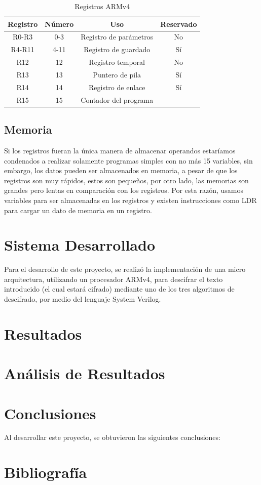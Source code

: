 \documentclass[journal,trans]{IEEEtran}
\begin{document}
	\begin{table}[htbp]
		\centering
		\begin{tabular}{|c|c|c|c|}
			\hline
			Registro & Número & Uso                    & Reservado \\
			\hline
			\hline
			R0-R3    & 0-3    & Registro de parámetros & No        \\
			\hline
			R4-R11   & 4-11   & Registro de guardado   & Sí        \\
			\hline
			R12      & 12     & Registro temporal      & No        \\
			\hline
			R13      & 13     & Puntero de pila        & Sí        \\
			\hline
			R14      & 14     & Registro de enlace     & Sí        \\
			\hline
			R15      & 15     & Contador del programa  &           \\
			\hline
		\end{tabular}
		\caption{Registros ARMv4}
		\label{tab:Registros}
	\end{table}
	
	\subsection{Memoria}
	Si los registros fueran la única manera de almacenar operandos estaríamos condenados a realizar solamente programas simples con no más 15 variables, sin embargo, los datos pueden ser almacenados en memoria, a pesar de que los registros son muy rápidos, estos son pequeños, por otro lado, las memorias son grandes pero lentas en comparación con los registros. Por esta razón, usamos variables para ser almacenadas en los registros y existen instrucciones como LDR para cargar un dato de memoria en un registro.
	
	\section{Sistema Desarrollado}
	Para el desarrollo de este proyecto, se realizó la implementación de una micro arquitectura, utilizando un procesador ARMv4, para descifrar el texto introducido (el cual estará cifrado) mediante uno de los tres algoritmos de descifrado, por medio del lenguaje System Verilog.
	
	\section{Resultados}
	
	\section{Análisis de Resultados}
	
	\section{Conclusiones}
	Al desarrollar este proyecto, se obtuvieron las siguientes conclusiones:
	
	\section{Bibliografía}
	
	
	
	
\end{document}
